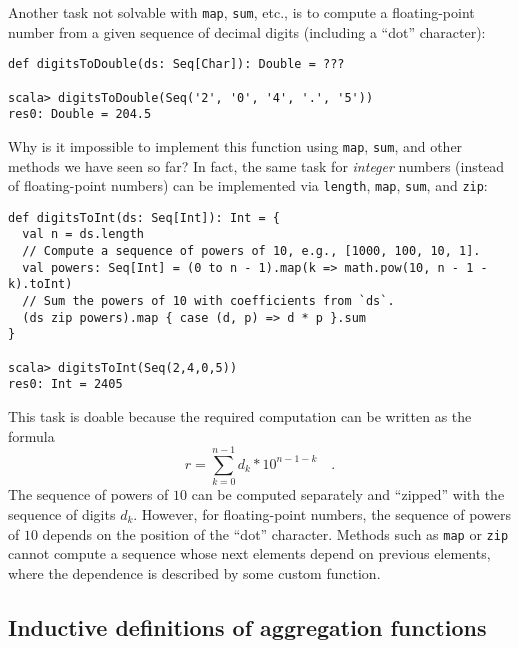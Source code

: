 Another task not solvable with \lstinline!map!, \lstinline!sum!,
etc., is to compute a floating-point number from a given sequence
of decimal digits (including a \textsf{``}dot\textsf{''} character):
\begin{lstlisting}
def digitsToDouble(ds: Seq[Char]): Double = ???

scala> digitsToDouble(Seq('2', '0', '4', '.', '5'))
res0: Double = 204.5
\end{lstlisting}
Why is it impossible to implement this function using \lstinline!map!,
\lstinline!sum!, and other methods we have seen so far? In fact,
the same task for \emph{integer} numbers (instead of floating-point
numbers) can be implemented via \lstinline!length!, \lstinline!map!,
\lstinline!sum!, and \lstinline!zip!:
\begin{lstlisting}
def digitsToInt(ds: Seq[Int]): Int = {
  val n = ds.length
  // Compute a sequence of powers of 10, e.g., [1000, 100, 10, 1].
  val powers: Seq[Int] = (0 to n - 1).map(k => math.pow(10, n - 1 - k).toInt)
  // Sum the powers of 10 with coefficients from `ds`.
  (ds zip powers).map { case (d, p) => d * p }.sum                                  
}

scala> digitsToInt(Seq(2,4,0,5))
res0: Int = 2405
\end{lstlisting}
This task is doable because the required computation can be written
as the formula
\[
r=\sum_{k=0}^{n-1}d_{k}*10^{n-1-k}\quad.
\]
The sequence of powers of $10$ can be computed separately and \textsf{``}zipped\textsf{''}
with the sequence of digits $d_{k}$. However, for floating-point
numbers, the sequence of powers of $10$ depends on the position of
the \textsf{``}dot\textsf{''} character. Methods such as \lstinline!map! or \lstinline!zip!
cannot compute a sequence whose next elements depend on previous elements,
where the dependence is described by some custom function.

\subsection{Inductive definitions of aggregation functions\label{subsec:Inductive-definitions-of-aggregation-functions}}

